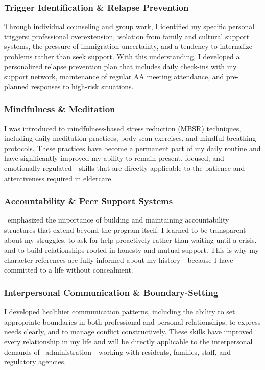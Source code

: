\subsubsection{Trigger Identification \& Relapse Prevention}
Through individual counseling and group work, I identified my specific personal triggers: professional overextension, isolation from family and cultural support systems, the pressure of immigration uncertainty, and a tendency to internalize problems rather than seek support. With this understanding, I developed a personalized relapse prevention plan that includes daily check-ins with my support network, maintenance of regular AA meeting attendance, and pre-planned responses to high-risk situations.

\subsubsection{Mindfulness \& Meditation}
I was introduced to mindfulness-based stress reduction (MBSR) techniques, including daily meditation practices, body scan exercises, and mindful breathing protocols. These practices have become a permanent part of my daily routine and have significantly improved my ability to remain present, focused, and emotionally regulated---skills that are directly applicable to the patience and attentiveness required in eldercare.

\subsubsection{Accountability \& Peer Support Systems}
\RehabProgram\ emphasized the importance of building and maintaining accountability structures that extend beyond the program itself. I learned to be transparent about my struggles, to ask for help proactively rather than waiting until a crisis, and to build relationships rooted in honesty and mutual support. This is why my character references are fully informed about my history---because I have committed to a life without concealment.

\subsubsection{Interpersonal Communication \& Boundary-Setting}
I developed healthier communication patterns, including the ability to set appropriate boundaries in both professional and personal relationships, to express needs clearly, and to manage conflict constructively. These skills have improved every relationship in my life and will be directly applicable to the interpersonal demands of \FacilityTypeShort\ administration---working with residents, families, staff, and regulatory agencies.

